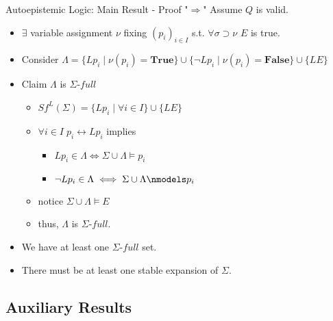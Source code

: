 \documentclass[usenames,dvipsnames, 8pt]{beamer}
\let\liff\leftrightarrow
\let\lneg\neg
\begin{document}
\begin{frame}{Autoepistemic Logic: Main Result - Proof "$\Longrightarrow$"}
Assume $Q$ is valid.
\begin{itemize}[label = {$\bullet$}]
\item $\exists$ variable assignment $\nu$ fixing $(p_i)_{i\in I}$ s.t. $\forall \sigma \supset \nu$ $E$ is true.
\item Consider $\Lambda = \{Lp_i \mid \nu(p_i)=\mathbf{True}\} \cup \{\neg Lp_i \mid \nu(p_i)=\mathbf{False}\} \cup \{LE\}$
\item Claim $\Lambda$ is $\Sigma\textit{-full}$
\begin{itemize}[label={$-$}]
\item $Sf^L(\Sigma)=\{Lp_i\mid \forall i \in I\} \cup \{LE\}$
\item $\forall i \in I \; p_i \liff Lp_i$ implies 
\begin{itemize}[label={$>$}]
\item $Lp_i \in \Lambda \iff \Sigma \cup \Lambda \models p_i$
\item $\lneg Lp_i \in \Lambda \iff \Sigma \cup \Lambda \nmodels p_i$
\end{itemize}
\item notice $\Sigma \cup \Lambda \models E$
\item thus, $\Lambda$ is $\Sigma\textit{-full}$.
\end{itemize} 
\item We have at least one $\Sigma\textit{-full}$ set.
\item There must be at least one stable expansion of $\Sigma$.
\end{itemize}
\end{frame}


\subsection{Auxiliary Results}
\end{document}
